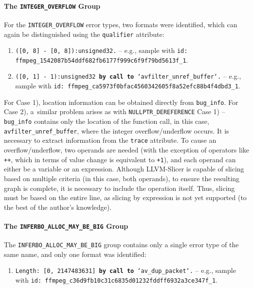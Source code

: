 \paragraph{The \texttt{INTEGER\_OVERFLOW} Group}
For the \texttt{INTEGER\_OVERFLOW} error types, two formats were identified, which can again be distinguished using the \texttt{qualifier} attribute:
\begin{enumerate}
    \item \texttt{([0, 8] - [0, 8]):unsigned32.} 
    \newline
    -- e.g., sample with \texttt{id: ffmpeg\_1542087b54ddf682fb6177f999c6f9f79bd5613f\_1}.
    \item \texttt{([0, 1] - 1):unsigned32 \textbf{by call to} `avfilter\_unref\_buffer`.} 
    \newline
    -- e.g., sample with \texttt{id: ffmpeg\_ca5973f0bfac4560342605f8a52efc88b4f4dbd3\_1}.
\end{enumerate}
For Case 1), location information can be obtained directly from \texttt{bug\_info}. For Case 2), a~similar problem arises as with \texttt{NULLPTR\_DEREFERENCE} Case 1) -- \texttt{bug\_info} contains only the location of the function call, in this case, \texttt{avfilter\_unref\_buffer}, where the integer overflow/underflow occurs. It is necessary to extract information from the \texttt{trace} attribute. To cause an overflow/underflow, two operands are needed (with the exception of operators like \texttt{++}, which in terms of value change is equivalent to \texttt{+1}), and each operand can either be a variable or an expression. Although LLVM-Slicer is capable of slicing based on multiple criteria (in this case, both operands), to ensure the resulting graph is complete, it is necessary to include the operation itself. Thus, slicing must be based on the entire line, as slicing by expression is not yet supported (to the best of the author's knowledge).

\paragraph{The \texttt{INFERBO\_ALLOC\_MAY\_BE\_BIG} Group}
The \texttt{INFERBO\_ALLOC\_MAY\_BE\_BIG} group contains only a single error type of the same name, and only one format was identified:
\begin{enumerate}
    \item \texttt{Length: [0, 2147483631] \textbf{by call to} `av\_dup\_packet`.}
    \newline
    -- e.g., sample with \texttt{id: ffmpeg\_c36d9fb10c31c6835d01232fddff6932a3ce347f\_1}.
\end{enumerate}

